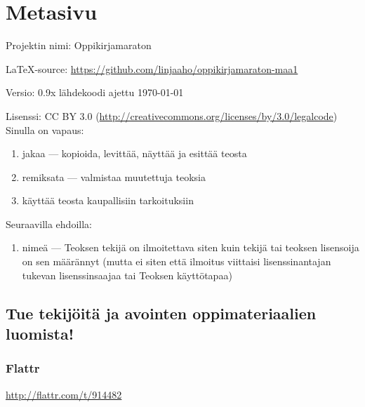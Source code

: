 \newpage

\section*{Metasivu}

Projektin nimi: Oppikirjamaraton

LaTeX-source: \url{https://github.com/linjaaho/oppikirjamaraton-maa1}

Versio: 0.9x \qquad lähdekoodi ajettu \today

Lisenssi: CC BY 3.0 (\url{http://creativecommons.org/licenses/by/3.0/legalcode})\\
Sinulla on vapaus:
\begin{enumerate}
\item jakaa — kopioida, levittää, näyttää ja esittää teosta
\item remiksata — valmistaa muutettuja teoksia
\item käyttää teosta kaupallisiin tarkoituksiin
\end{enumerate}
Seuraavilla ehdoilla:
\begin{enumerate}
\item nimeä — Teoksen tekijä on ilmoitettava siten kuin tekijä tai teoksen lisensoija on sen määrännyt (mutta ei siten että ilmoitus viittaisi lisenssinantajan tukevan lisenssinsaajaa tai Teoksen käyttötapaa)
\end{enumerate}

\subsection*{Tue tekijöitä ja avointen oppimateriaalien luomista!}

\subsubsection*{Flattr}

\url{http://flattr.com/t/914482}


